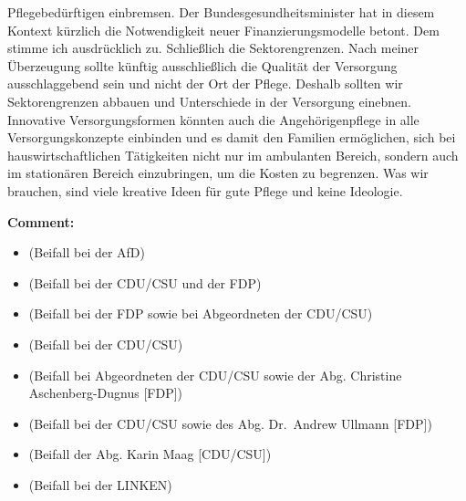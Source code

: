\documentclass{article}
\begin{document}
Pflegebedürftigen einbremsen. Der Bundesgesundheitsminister hat in diesem Kontext kürzlich die Notwendigkeit neuer Finanzierungsmodelle betont. Dem stimme ich ausdrücklich zu.  Schließlich die Sektorengrenzen. Nach meiner Überzeugung sollte künftig ausschließlich die Qualität der Versorgung ausschlaggebend sein und nicht der Ort der Pflege. Deshalb sollten wir Sektorengrenzen abbauen und Unterschiede in der Versorgung einebnen. Innovative Versorgungsformen könnten auch die Angehörigenpflege in alle Versorgungskonzepte einbinden und es damit den Familien ermöglichen, sich bei hauswirtschaftlichen Tätigkeiten nicht nur im ambulanten Bereich, sondern auch im stationären Bereich einzubringen, um die Kosten zu begrenzen. Was wir brauchen, sind viele kreative Ideen für gute Pflege und keine Ideologie.  

\noindent\textbf{Comment:}
\begin{itemize}
    \setlength\itemsep{-3pt}
    \item (Beifall bei der AfD)
    \setlength\itemsep{-3pt}
    \item (Beifall bei der CDU/CSU und der FDP)
    \setlength\itemsep{-3pt}
    \item (Beifall bei der FDP sowie bei Abgeordneten der CDU/CSU)
    \setlength\itemsep{-3pt}
    \item (Beifall bei der CDU/CSU)
    \setlength\itemsep{-3pt}
    \item (Beifall bei Abgeordneten der CDU/CSU sowie der Abg. Christine Aschenberg-Dugnus [FDP])
    \setlength\itemsep{-3pt}
    \item (Beifall bei der CDU/CSU sowie des Abg. Dr. Andrew Ullmann [FDP])
    \setlength\itemsep{-3pt}
    \item (Beifall der Abg. Karin Maag [CDU/CSU])
    \setlength\itemsep{-3pt}
    \item (Beifall bei der LINKEN)
\end{itemize}
\end{document}
